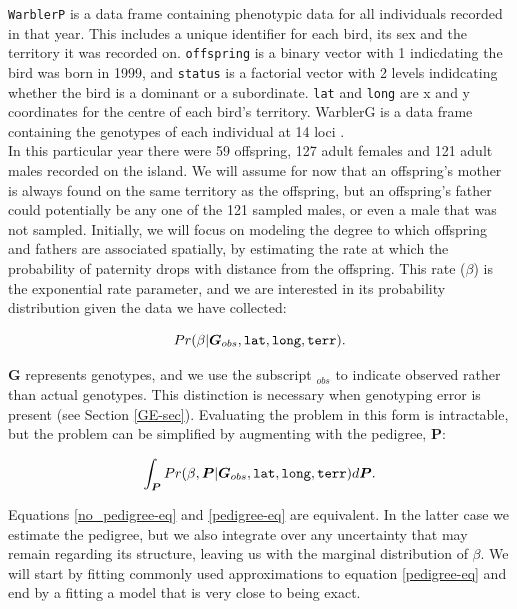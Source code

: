 \documentclass{article}
\begin{document}
 \texttt{WarblerP} is a data frame containing phenotypic data for all individuals recorded in that year.  This includes a unique identifier for each bird, its sex and the territory it was recorded on. \texttt{offspring} is a binary vector with 1 indicdating the bird was born in 1999, and \texttt{status} is a factorial vector with 2 levels indidcating whether the bird is a dominant or a subordinate. \texttt{lat} and \texttt{long} are x and y coordinates for the centre of each bird's territory. {WarblerG} is a data frame containing the genotypes of each individual at 14 loci \citep{Richardson.2000}.\\

In this particular year there were 59 offspring, 127 adult females and 121 adult males recorded on the island.  We will assume for now that an offspring's mother is always found on the same territory as the offspring, but an offspring's father could potentially be any one of the 121 sampled males, or even a male that was not sampled.  Initially, we will focus on modeling the degree to which offspring and fathers are associated spatially, by estimating the rate at which the probability of paternity drops with distance from the offspring.  This rate ($\beta$) is the exponential rate parameter, and we are interested in its probability distribution given the data we have collected:


\begin{equation}
Pr(\beta | \bm{G}_{obs}, \textrm{\texttt{lat}}, \textrm{\texttt{long}}, \textrm{\texttt{terr}}).
\label{no_pedigree-eq}
\end{equation}

$\bm{G}$ represents genotypes, and we use the subscript $_{obs}$ to indicate observed rather than actual genotypes. This distinction is necessary when genotyping error is present (see Section \ref{GE-sec}).  Evaluating the problem in this form is intractable, but the problem can be simplified by augmenting with the pedigree, $\bm{P}$:

\begin{equation}
\int_{\bm P}Pr(\beta,  {\bm P}| \bm{G}_{obs}, \textrm{\texttt{lat}}, \textrm{\texttt{long}}, \textrm{\texttt{terr}})d{\bm P}.
\label{pedigree-eq}
\end{equation}

Equations \ref{no_pedigree-eq} and \ref{pedigree-eq} are equivalent. In the latter case we estimate the pedigree, but we also integrate over any uncertainty that may remain regarding its structure, leaving us with the marginal distribution of $\beta$.  We will start by fitting commonly used approximations to equation \ref{pedigree-eq} and end by a fitting a model that is very close to being exact.
\end{document}
